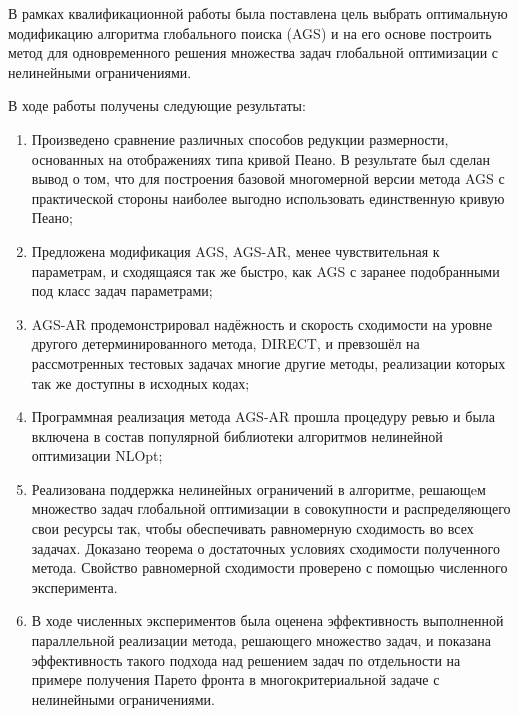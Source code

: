 
В рамках квалификационной работы была поставлена цель выбрать оптимальную модификацию алгоритма глобального поиска (AGS)
и на его основе построить метод для одновременного решения множества задач глобальной оптимизации с нелинейными ограничениями.

В ходе работы получены следующие результаты:
\begin{enumerate}
    \item Произведено сравнение различных способов редукции размерности, основанных на отображениях типа кривой Пеано.
    В результате был сделан вывод о том, что для построения базовой многомерной версии метода AGS 
    с практической стороны наиболее выгодно использовать единственную кривую Пеано;
    \item Предложена модификация AGS, AGS-AR, менее чувствительная к параметрам, и сходящаяся так же быстро, как AGS
    с заранее подобранными под класс задач параметрами;
    \item AGS-AR продемонстрировал надёжность и скорость сходимости на уровне другого детерминированного метода, DIRECT,
    и превзошёл на рассмотренных тестовых задачах многие другие методы, реализации которых так же доступны в исходных кодах;
    \item Программная реализация метода AGS-AR прошла процедуру ревью и была включена в состав популярной библиотеки
    алгоритмов нелинейной оптимизации NLOpt;
    \item Реализована поддержка нелинейных ограничений в алгоритме, решающeм
    множество задач глобальной оптимизации в совокупности и распределяющего свои ресурсы так, чтобы
    обеспечивать равномерную сходимость во всех задачах. Доказано теорема о достаточных условиях сходимости
    полученного метода. Свойство равномерной сходимости проверено с помощью численного эксперимента.
    \item В ходе численных экспериментов была оценена эффективность выполненной параллельной реализации метода, решающего множество задач, и
    показана эффективность такого подхода над решением задач по отдельности на примере получения Парето фронта в многокритериальной задаче с
    нелинейными ограничениями.
\end{enumerate}
